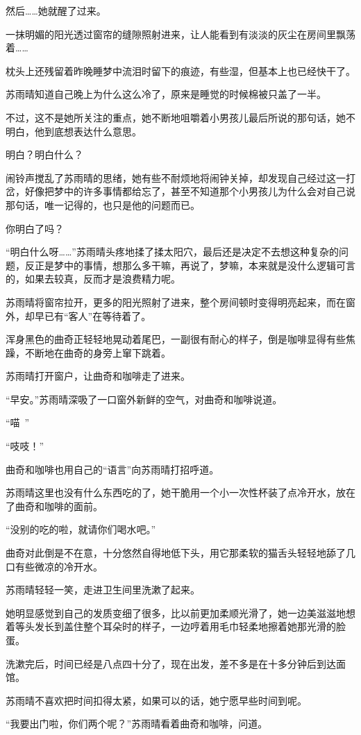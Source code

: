 然后……她就醒了过来。

一抹明媚的阳光透过窗帘的缝隙照射进来，让人能看到有淡淡的灰尘在房间里飘荡着……

枕头上还残留着昨晚睡梦中流泪时留下的痕迹，有些湿，但基本上也已经快干了。

苏雨晴知道自己晚上为什么这么冷了，原来是睡觉的时候棉被只盖了一半。

不过，这不是她所关注的重点，她不断地咀嚼着小男孩儿最后所说的那句话，她不明白，他到底想表达什么意思。

明白？明白什么？

闹铃声搅乱了苏雨晴的思绪，她有些不耐烦地将闹钟关掉，却发现自己经过这一打岔，好像把梦中的许多事情都给忘了，甚至不知道那个小男孩儿为什么会对自己说那句话，唯一记得的，也只是他的问题而已。

你明白了吗？

“明白什么呀……”苏雨晴头疼地揉了揉太阳穴，最后还是决定不去想这种复杂的问题，反正是梦中的事情，想那么多干嘛，再说了，梦嘛，本来就是没什么逻辑可言的，如果去较真，反而才是浪费精力呢。

苏雨晴将窗帘拉开，更多的阳光照射了进来，整个房间顿时变得明亮起来，而在窗外，却早已有“客人”在等待着了。

浑身黑色的曲奇正轻轻地晃动着尾巴，一副很有耐心的样子，倒是咖啡显得有些焦躁，不断地在曲奇的身旁上窜下跳着。

苏雨晴打开窗户，让曲奇和咖啡走了进来。

“早安。”苏雨晴深吸了一口窗外新鲜的空气，对曲奇和咖啡说道。

“喵~”

“吱吱！”

曲奇和咖啡也用自己的“语言”向苏雨晴打招呼道。

苏雨晴这里也没有什么东西吃的了，她干脆用一个小一次性杯装了点冷开水，放在了曲奇和咖啡的面前。

“没别的吃的啦，就请你们喝水吧。”

曲奇对此倒是不在意，十分悠然自得地低下头，用它那柔软的猫舌头轻轻地舔了几口有些微凉的冷开水。

苏雨晴轻轻一笑，走进卫生间里洗漱了起来。

她明显感觉到自己的发质变细了很多，比以前更加柔顺光滑了，她一边美滋滋地想着等头发长到盖住整个耳朵时的样子，一边哼着用毛巾轻柔地擦着她那光滑的脸蛋。

洗漱完后，时间已经是八点四十分了，现在出发，差不多是在十多分钟后到达面馆。

苏雨晴不喜欢把时间扣得太紧，如果可以的话，她宁愿早些时间到呢。

“我要出门啦，你们两个呢？”苏雨晴看着曲奇和咖啡，问道。

